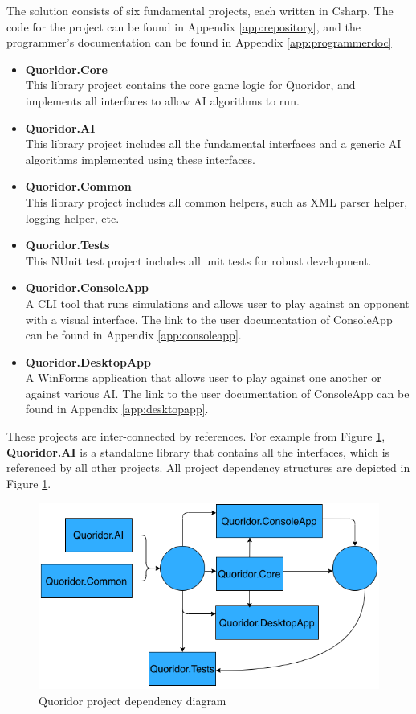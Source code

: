 The solution consists of six fundamental projects, each written in \gls{Csharp}. The code for the project can be found in Appendix \ref{app:repository}, and the programmer's documentation can be found in Appendix \ref{app:programmerdoc}

\begin{itemize}
    \item \textbf{Quoridor.Core}\\
        This library project contains the core game logic for Quoridor, and implements all interfaces to allow \gls{AI} algorithms to run.
        
    \item \textbf{Quoridor.AI}\\
        This library project includes all the fundamental interfaces and a generic \gls{AI} algorithms implemented using these interfaces.

    \item \textbf{Quoridor.Common}\\
        This library project includes all common helpers, such as XML parser helper, logging helper, etc.

    \item \textbf{Quoridor.Tests}\\
        This NUnit test project includes all unit tests for robust development.

    \item \textbf{Quoridor.ConsoleApp}\\
        A CLI tool that runs simulations and allows user to play against an opponent with a visual interface. The link to the user documentation of ConsoleApp can be found in Appendix \ref{app:consoleapp}.

    \item \textbf{Quoridor.DesktopApp}\\
        A WinForms application that allows user to play against one another or against various \gls{AI}. The link to the user documentation of ConsoleApp can be found in Appendix \ref{app:desktopapp}.

\end{itemize}

These projects are inter-connected by references. For example from Figure \ref{fig:proj_dep}, \textbf{Quoridor.AI} is a standalone library that contains all the interfaces, which is referenced by all other projects.
All project dependency structures are depicted in Figure \ref{fig:proj_dep}.

\begin{figure}[!ht]
    \centering
    \includegraphics[width=.95\linewidth]{../img/project_structure.png}
    \caption{Quoridor project dependency diagram}
    \label{fig:proj_dep}
\end{figure}